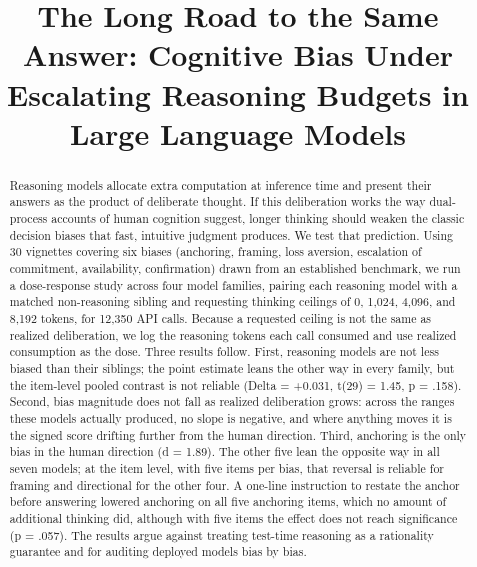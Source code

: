 \documentclass[conference]{IEEEtran}
\begin{document}
\title{The Long Road to the Same Answer: Cognitive Bias Under Escalating Reasoning Budgets in Large Language Models}

\author{
}

\maketitle

\begin{abstract}
Reasoning models allocate extra computation at inference time and present their answers as the product of deliberate thought. If this deliberation works the way dual-process accounts of human cognition suggest, longer thinking should weaken the classic decision biases that fast, intuitive judgment produces. We test that prediction. Using 30 vignettes covering six biases (anchoring, framing, loss aversion, escalation of commitment, availability, confirmation) drawn from an established benchmark, we run a dose-response study across four model families, pairing each reasoning model with a matched non-reasoning sibling and requesting thinking ceilings of 0, 1,024, 4,096, and 8,192 tokens, for 12,350 API calls. Because a requested ceiling is not the same as realized deliberation, we log the reasoning tokens each call consumed and use realized consumption as the dose. Three results follow. First, reasoning models are not less biased than their siblings; the point estimate leans the other way in every family, but the item-level pooled contrast is not reliable (Delta = +0.031, t(29) = 1.45, p = .158). Second, bias magnitude does not fall as realized deliberation grows: across the ranges these models actually produced, no slope is negative, and where anything moves it is the signed score drifting further from the human direction. Third, anchoring is the only bias in the human direction (d = 1.89). The other five lean the opposite way in all seven models; at the item level, with five items per bias, that reversal is reliable for framing and directional for the other four. A one-line instruction to restate the anchor before answering lowered anchoring on all five anchoring items, which no amount of additional thinking did, although with five items the effect does not reach significance (p = .057). The results argue against treating test-time reasoning as a rationality guarantee and for auditing deployed models bias by bias.
\end{abstract}
\end{document}
